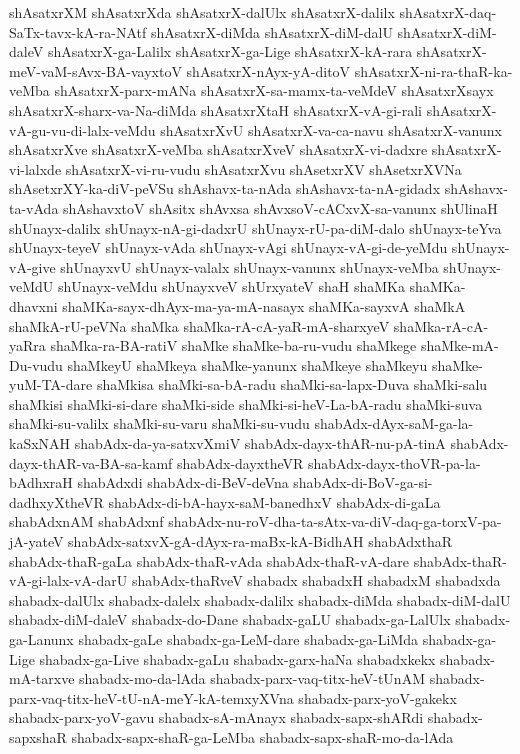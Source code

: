{shAsatxrXM
shAsatxrXda
shAsatxrX-dalUlx
shAsatxrX-dalilx
shAsatxrX-daq-SaTx-tavx-kA-ra-NAtf
shAsatxrX-diMda
shAsatxrX-diM-dalU
shAsatxrX-diM-daleV
shAsatxrX-ga-Lalilx
shAsatxrX-ga-Lige
shAsatxrX-kA-rara
shAsatxrX-meV-vaM-sAvx-BA-vayxtoV
shAsatxrX-nAyx-yA-ditoV
shAsatxrX-ni-ra-thaR-ka-veMba
shAsatxrX-parx-mANa
shAsatxrX-sa-mamx-ta-veMdeV
shAsatxrXsayx
shAsatxrX-sharx-va-Na-diMda
shAsatxrXtaH
shAsatxrX-vA-gi-rali
shAsatxrX-vA-gu-vu-di-lalx-veMdu
shAsatxrXvU
shAsatxrX-va-ca-navu
shAsatxrX-vanunx
shAsatxrXve
shAsatxrX-veMba
shAsatxrXveV
shAsatxrX-vi-dadxre
shAsatxrX-vi-lalxde
shAsatxrX-vi-ru-vudu
shAsatxrXvu
shAsetxrXV
shAsetxrXVNa
shAsetxrXY-ka-diV-peVSu
shAshavx-ta-nAda
shAshavx-ta-nA-gidadx
shAshavx-ta-vAda
shAshavxtoV
shAsitx
shAvxsa
shAvxsoV-cACxvX-sa-vanunx
shUlinaH
shUnayx-dalilx
shUnayx-nA-gi-dadxrU
shUnayx-rU-pa-diM-dalo
shUnayx-teYva
shUnayx-teyeV
shUnayx-vAda
shUnayx-vAgi
shUnayx-vA-gi-de-yeMdu
shUnayx-vA-give
shUnayxvU
shUnayx-valalx
shUnayx-vanunx
shUnayx-veMba
shUnayx-veMdU
shUnayx-veMdu
shUnayxveV
shUrxyateV
shaH
shaMKa
shaMKa-dhavxni
shaMKa-sayx-dhAyx-ma-ya-mA-nasayx
shaMKa-sayxvA
shaMkA
shaMkA-rU-peVNa
shaMka
shaMka-rA-cA-yaR-mA-sharxyeV
shaMka-rA-cA-yaRra
shaMka-ra-BA-ratiV
shaMke
shaMke-ba-ru-vudu
shaMkege
shaMke-mA-Du-vudu
shaMkeyU
shaMkeya
shaMke-yanunx
shaMkeye
shaMkeyu
shaMke-yuM-TA-dare
shaMkisa
shaMki-sa-bA-radu
shaMki-sa-lapx-Duva
shaMki-salu
shaMkisi
shaMki-si-dare
shaMki-side
shaMki-si-heV-La-bA-radu
shaMki-suva
shaMki-su-valilx
shaMki-su-varu
shaMki-su-vudu
shabAdx-dAyx-saM-ga-la-kaSxNAH
shabAdx-da-ya-satxvXmiV
shabAdx-dayx-thAR-nu-pA-tinA
shabAdx-dayx-thAR-va-BA-sa-kamf
shabAdx-dayxtheVR
shabAdx-dayx-thoVR-pa-la-bAdhxraH
shabAdxdi
shabAdx-di-BeV-deVna
shabAdx-di-BoV-ga-si-dadhxyXtheVR
shabAdx-di-bA-hayx-saM-banedhxV
shabAdx-di-gaLa
shabAdxnAM
shabAdxnf
shabAdx-nu-roV-dha-ta-sAtx-va-diV-daq-ga-torxV-pa-jA-yateV
shabAdx-satxvX-gA-dAyx-ra-maBx-kA-BidhAH
shabAdxthaR
shabAdx-thaR-gaLa
shabAdx-thaR-vAda
shabAdx-thaR-vA-dare
shabAdx-thaR-vA-gi-lalx-vA-darU
shabAdx-thaRveV
shabadx
shabadxH
shabadxM
shabadxda
shabadx-dalUlx
shabadx-dalelx
shabadx-dalilx
shabadx-diMda
shabadx-diM-dalU
shabadx-diM-daleV
shabadx-do-Dane
shabadx-gaLU
shabadx-ga-LalUlx
shabadx-ga-Lanunx
shabadx-gaLe
shabadx-ga-LeM-dare
shabadx-ga-LiMda
shabadx-ga-Lige
shabadx-ga-Live
shabadx-gaLu
shabadx-garx-haNa
shabadxkekx
shabadx-mA-tarxve
shabadx-mo-da-lAda
shabadx-parx-vaq-titx-heV-tUnAM
shabadx-parx-vaq-titx-heV-tU-nA-meY-kA-temxyXVna
shabadx-parx-yoV-gakekx
shabadx-parx-yoV-gavu
shabadx-sA-mAnayx
shabadx-sapx-shARdi
shabadx-sapxshaR
shabadx-sapx-shaR-ga-LeMba
shabadx-sapx-shaR-mo-da-lAda
}
